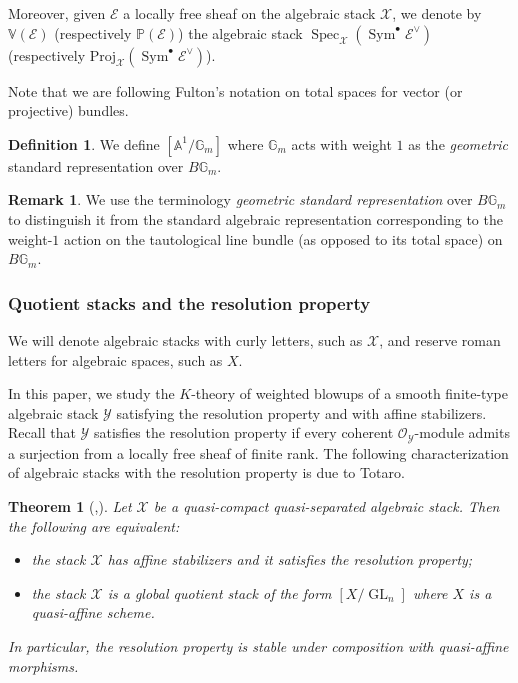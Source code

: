 \documentclass[12pt]{amsart}
\newcommand\spec{\operatorname{Spec}}
\newcommand\G{\mathbb{G}}
\newcommand\Gm{\mathbb{G}_m}
\newcommand\Proj{\text{Proj}}
\newcommand{\bA}{\mathbb{A}}
\newcommand{\bP}{\mathbb{P}}
\newcommand{\sE}{\mathscr{E}}
\newcommand{\sO}{\mathscr{O}}
\newcommand{\cX}{\mathcal{X}}
\newcommand{\cY}{\mathcal{Y}}
\newcommand{\Sym}{\operatorname{Sym}}
\newcommand{\GL}{\operatorname{GL}}
\newtheorem{Thm}[theorem]{Theorem}
\theoremstyle{definition}
\newtheorem{Def}[theorem]{Definition}
\newtheorem{Rmk}[theorem]{Remark}
\begin{document}
Moreover, given $\sE$ a locally free sheaf on the algebraic stack $\cX$, we denote by $\mathbb{V}(\sE)$ (respectively $\bP(\sE)$) the algebraic stack $\spec_{\cX}(\Sym^{\bullet}\sE^{\vee})$ (respectively $\Proj_{\cX}(\Sym^{\bullet}\sE^{\vee})$).

Note that we are following Fulton's notation on total spaces for vector (or projective) bundles.

\begin{Def}
    We define $[\bA^1/\Gm]$ where $\Gm$ acts with weight $1$ as the \emph{geometric} standard representation over $B\Gm$. 
\end{Def}

\begin{Rmk}
We use the terminology \emph{geometric standard representation} over $B\Gm$ to distinguish it from the standard algebraic representation corresponding to the weight-$1$ action on the tautological line bundle (as opposed to its total space) on $B\G_m$.
\end{Rmk}

\subsubsection{Quotient stacks and the resolution property}\label{sec: notation-resolution}

We will denote algebraic stacks with curly letters, such as $\cX$, and reserve roman letters for algebraic spaces, such as $X$. 

In this paper, we study the $K$-theory of weighted blowups of a smooth finite-type algebraic stack $\cY$ satisfying the resolution property and with affine stabilizers. Recall that $\cY$ satisfies the resolution property if every coherent $\sO_{\cY}$-module admits a surjection from a locally free sheaf of finite rank. The following characterization of algebraic stacks with the resolution property is due to Totaro.

\begin{Thm}[{\cite[Theorem 1.1]{totaro_resolution},\cite[Theorem A]{Gross_resolution_property}}]\label{thm: basics on resolution property}
   Let $\cX$ be a quasi-compact quasi-separated algebraic stack. Then the following are equivalent:
   \begin{itemize}
       \item the stack $\cX$ has affine stabilizers and it satisfies the resolution property;
       \item the stack $\cX$ is a global quotient stack of the form $[X/\GL_n]$ where $X$ is a quasi-affine scheme.
   \end{itemize}
   In particular, the resolution property is stable under composition with quasi-affine morphisms.
\end{Thm}
\end{document}
